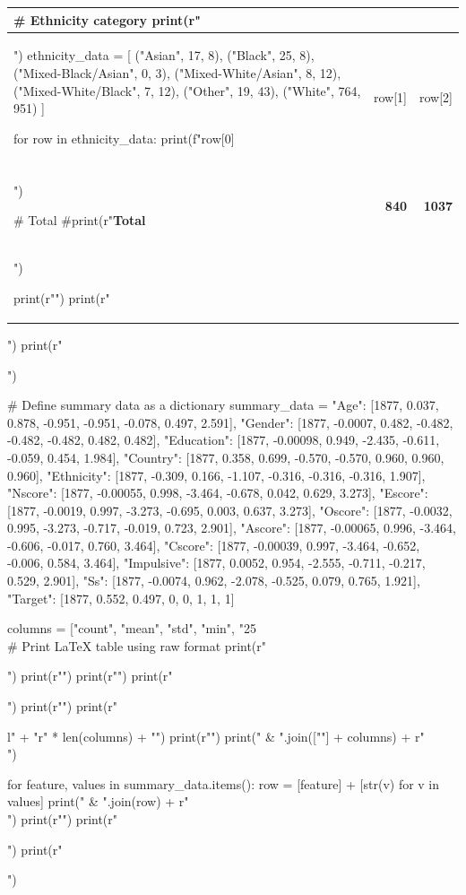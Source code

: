 \documentclass{article}
\begin{document}
\begin{pycode}
\begin{table}[h!]
\begin{tabular}{|l|r|r|}
# Ethnicity category
print(r"\multicolumn{3}{|l|}{\textbf{Ethnicity category}} \\ \hline")
ethnicity_data = [
    ("Asian", 17, 8),
    ("Black", 25, 8),
    ("Mixed-Black/Asian", 0, 3),
    ("Mixed-White/Asian", 8, 12),
    ("Mixed-White/Black", 7, 12),
    ("Other", 19, 43),
    ("White", 764, 951)
    ]

for row in ethnicity_data:
    print(f"{row[0]} & {row[1]} & {row[2]} \\\\ \hline")

# Total
#print(r"\textbf{Total} & \textbf{840} & \textbf{1037} \\ \hline")

print(r"\bottomrule")
print(r"\end{tabular}")
print(r"\end{table}")
\end{pycode}


\begin{pycode}
# Define summary data as a dictionary
summary_data = {
    "Age":         [1877, 0.037, 0.878, -0.951, -0.951, -0.078, 0.497, 2.591],
    "Gender":      [1877, -0.0007, 0.482, -0.482, -0.482, -0.482, 0.482, 0.482],
    "Education":   [1877, -0.00098, 0.949, -2.435, -0.611, -0.059, 0.454, 1.984],
    "Country":     [1877, 0.358, 0.699, -0.570, -0.570, 0.960, 0.960, 0.960],
    "Ethnicity":   [1877, -0.309, 0.166, -1.107, -0.316, -0.316, -0.316, 1.907],
    "Nscore":      [1877, -0.00055, 0.998, -3.464, -0.678, 0.042, 0.629, 3.273],
    "Escore":      [1877, -0.0019, 0.997, -3.273, -0.695, 0.003, 0.637, 3.273],
    "Oscore":      [1877, -0.0032, 0.995, -3.273, -0.717, -0.019, 0.723, 2.901],
    "Ascore":      [1877, -0.00065, 0.996, -3.464, -0.606, -0.017, 0.760, 3.464],
    "Cscore":      [1877, -0.00039, 0.997, -3.464, -0.652, -0.006, 0.584, 3.464],
    "Impulsive":   [1877, 0.0052, 0.954, -2.555, -0.711, -0.217, 0.529, 2.901],
    "Ss":          [1877, -0.0074, 0.962, -2.078, -0.525, 0.079, 0.765, 1.921],
    "Target":      [1877, 0.552, 0.497, 0, 0, 1, 1, 1]
    }

columns = ["count", "mean", "std", "min", "25\\%

# Print LaTeX table using raw format
print(r"\begin{table}[h!]")
print(r"\centering")
print(r"\small")
print(r"\caption{Summary statistics of features and target variable}")
print(r"\label{tab:summary_statistics}")
print(r"\begin{tabular}{l" + "r" * len(columns) + "}")
print(r"\toprule")
print(" & ".join([""] + columns) + r" \\ \midrule")

for feature, values in summary_data.items():
    row = [feature] + [str(v) for v in values]
    print(" & ".join(row) + r" \\")
print(r"\bottomrule")
print(r"\end{tabular}")
print(r"\end{table}")
\end{pycode}
\end{document}
